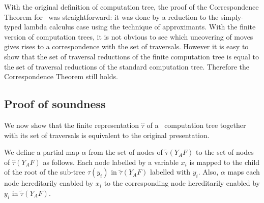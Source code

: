 \documentclass{article}
\begin{document}
With the original definition of computation tree, the proof of
the Correspondence Theorem for \pcf\ was straightforward: it was done by a reduction
to the simply-typed lambda calculus case using the technique of approximants.
With the finite version of computation trees, it is not obvious to see which uncovering of moves gives rises to a correspondence with the set of traversals. However it is easy to show that the set of traversal reductions of the finite computation tree is equal to the set of traversal reductions of the standard computation tree. Therefore the Correspondence Theorem still holds.


\subsection*{Proof of soundness}

We now show that the finite representation $\hat\tau$ of a \pcf\ computation tree together with its set of traversals is equivalent to the original presentation.


We define a partial map $\alpha$ from the set of nodes of $\widetilde\tau(Y_A F)$ to the set of nodes of $\hat\tau(Y_A F)$ as follows. Each node labelled by a variable $x_i$ is mapped to the child of the root of the sub-tree $\tau(y_i)$ in $\widetilde\tau(Y_A F)$ labelled with $y_i$. Also, $\alpha$ maps each node hereditarily enabled by $x_i$ to the corresponding node hereditarily enabled by $y_i$ in $\widetilde\tau(Y_A F)$.
\end{document}
